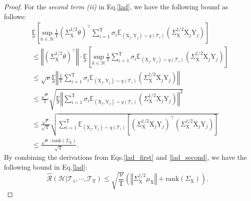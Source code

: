\begin{proof}
For the \textit{second term (ii)} in Eq.\ref{lad}, we have the following bound as follows:
\begin{equation}
\label{lad_second}
    \begin{aligned}
        &\underset{\sigma}{\mathbb E} \left[\underset{h\in\mathcal{H}}{\text{sup}}\frac{1}{\mathrm{T}}(\Sigma_\mathrm{X}^{1/2}\theta)^\top\sum_{i=1}^\mathrm{T}\sigma_i \mathbb E_{(\mathrm{X}_j,\mathrm{Y}_j) \sim q(\mathcal{T}_i)} \left(\Sigma_\mathrm{X}^{\dagger/2}\mathrm{X}_j\mathrm{Y}_j\right)\right] \\
        &\leq \left\Vert(\Sigma_{\mathrm{X}}^{1/2}\theta)^\top\right\Vert \cdot \underset{\sigma}{\mathbb E} \left[\underset{h\in\mathcal{H}}{\text{sup}}\frac{1}{\mathrm{T}}\sum_{i=1}^\mathrm{T}\sigma_i \mathbb E_{(\mathrm{X}_j,\mathrm{Y}_j) \sim q(\mathcal{T}_i)} \left(\Sigma_\mathrm{X}^{\dagger/2}\mathrm{X}_j\mathrm{Y}_j\right)\right] \\
        &\leq \sqrt{\nu}\underset{\sigma}{\mathbb E} \left\Vert\frac{1}{\mathrm{T}}\sum_{i=1}^\mathrm{T}\sigma_i \mathbb E_{(\mathrm{X}_j,\mathrm{Y}_j) \sim q(\mathcal{T}_i)} \left(\Sigma_\mathrm{X}^{\dagger/2}\mathrm{X}_j\mathrm{Y}_j\right)\right\Vert \\
        &\leq \frac{\sqrt{\nu}}{\mathrm{T}}\sqrt{\underset{\sigma}{\mathbb E}\left\Vert\sum_{i=1}^\mathrm{T}\sigma_i\mathbb E_{(\mathrm{X}_j,\mathrm{Y}_j)\sim q(\mathcal{T}_i)}(\Sigma_\mathrm{X}^{\dagger/2}\mathrm{X}_j\mathrm{Y}_j)\right\Vert^2} \\
        &\leq \frac{\sqrt{\nu}}{\sqrt{\mathrm{T}}}\sqrt{\sum_{i=1}^\mathrm{T}\mathbb E_{(\mathrm{X}_j,\mathrm{Y}_j)\sim q(\mathcal{T}_i)}\left[(\Sigma_\mathrm{X}^{\dagger/2}\mathrm{X}_j\mathrm{Y}_j)^\top(\Sigma_\mathrm{X}^{\dagger/2}\mathrm{X}_j\mathrm{Y}_j)\right]} \\
        &\leq \frac{\sqrt{\nu}\cdot\text{rank}(\Sigma_\mathrm{X})}{\sqrt{\mathrm{T}}}.
    \end{aligned}
\end{equation}
By combining the derivations from Eqs.\ref{lad_first} and \ref{lad_second}, we have the following bound in Eq.\ref{lad}:
\begin{equation}
    \hat{\mathcal{R}}(\mathcal{H}|\mathcal{T}_1,\cdots,\mathcal{T}_\mathrm{T}) \leq \sqrt{\frac{\nu}{\mathrm{T}}}\left(\left\Vert\Sigma_\mathrm{X}^{\dagger/2}\mu_\mathrm{X}\right\Vert + \text{rank}(\Sigma_\mathrm{X})\right).

\end{equation}
\end{proof}

